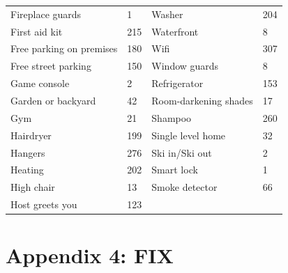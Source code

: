 \documentclass[a4paper, 12pt]{article}
\begin{document}
\begin{longtable}{p{5.5cm}p{2cm}p{5.5cm}p{2cm}}
Fireplace guards & 1 & Washer & 204 \\
First aid kit & 215 & Waterfront & 8 \\
Free parking on premises & 180 & Wifi & 307 \\
Free street parking & 150 & Window guards & 8 \\
Game console & 2 & Refrigerator & 153 \\
Garden or backyard & 42 & Room-darkening shades & 17 \\
Gym & 21 & Shampoo & 260 \\
Hairdryer & 199 & Single level home & 32 \\
Hangers & 276 & Ski in/Ski out & 2 \\
Heating & 202 & Smart lock & 1 \\
High chair & 13 & Smoke detector & 66 \\
Host greets you & 123 \\

\end{longtable}

\newpage






 \section*{Appendix 4: FIX}
\end{document}
